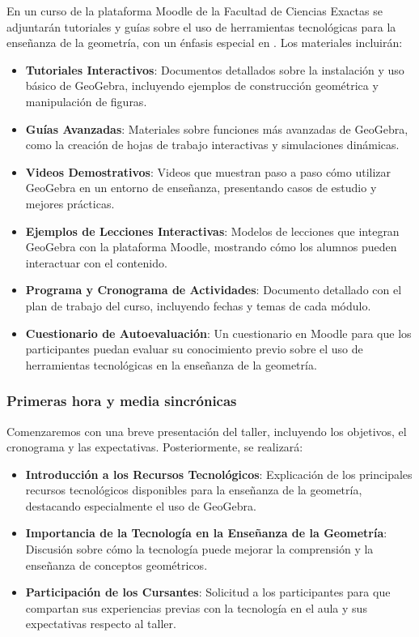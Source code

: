 En un curso de la plataforma Moodle de la Facultad de Ciencias Exactas se adjuntarán tutoriales y guías sobre el uso de herramientas tecnológicas para la enseñanza de la geometría, con un énfasis especial en \textcite{geogebra2024}. Los materiales incluirán:
\begin{itemize}
	\item \textbf{Tutoriales Interactivos}: Documentos detallados sobre la instalación y uso básico de GeoGebra, incluyendo ejemplos de construcción geométrica y manipulación de figuras.
	\item \textbf{Guías Avanzadas}: Materiales sobre funciones más avanzadas de GeoGebra, como la creación de hojas de trabajo interactivas y simulaciones dinámicas.
	\item \textbf{Videos Demostrativos}: Videos que muestran paso a paso cómo utilizar GeoGebra en un entorno de enseñanza, presentando casos de estudio y mejores prácticas.
	\item \textbf{Ejemplos de Lecciones Interactivas}: Modelos de lecciones que integran GeoGebra con la plataforma Moodle, mostrando cómo los alumnos pueden interactuar con el contenido.
	\item \textbf{Programa y Cronograma de Actividades}: Documento detallado con el plan de trabajo del curso, incluyendo fechas y temas de cada módulo.
	\item \textbf{Cuestionario de Autoevaluación}: Un cuestionario en Moodle para que los participantes puedan evaluar su conocimiento previo sobre el uso de herramientas tecnológicas en la enseñanza de la
	geometría.
\end{itemize}

\subsubsection{Primeras hora y media sincrónicas}

Comenzaremos con una breve presentación del taller, incluyendo los objetivos, el cronograma y las expectativas. Posteriormente, se realizará:

\begin{itemize}
	\item \textbf{Introducción a los Recursos Tecnológicos}: Explicación de los principales recursos tecnológicos disponibles para la enseñanza de la geometría, destacando especialmente el uso de GeoGebra.
	\item \textbf{Importancia de la Tecnología en la Enseñanza de la Geometría}: Discusión sobre cómo la tecnología puede mejorar la comprensión y la enseñanza de conceptos geométricos.
	\item \textbf{Participación de los Cursantes}: Solicitud a los participantes para que compartan sus experiencias previas con la tecnología en el aula y sus expectativas respecto al taller.
\end{itemize}

